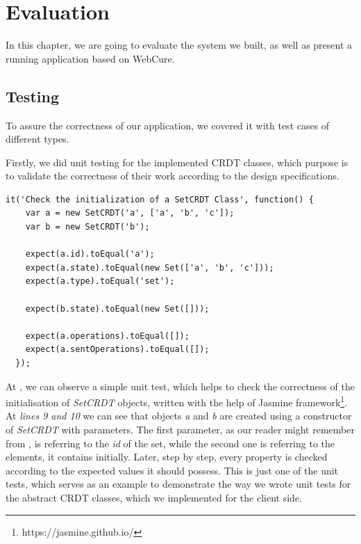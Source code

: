 \chapter{Evaluation}
\label{Evaluation}

In this chapter, we are going to evaluate the system we built, as well as present a running application based on WebCure. 

\section{Testing}

To assure the correctness of our application, we covered it with test cases of different types. 

Firstly, we did unit testing for the implemented CRDT classes, which purpose is to validate the correctness of their work according to the design specifications. 

\begin{lstlisting}[caption={[Unit test example for the \textit{SetCRDT} class]Simple unit test that checks the correct initialization of objects of a \textit{SetCRDT} class.}, label={lst:ev1}]
  it('Check the initialization of a SetCRDT Class', function() {
    var a = new SetCRDT('a', ['a', 'b', 'c']);
    var b = new SetCRDT('b');

    expect(a.id).toEqual('a');
    expect(a.state).toEqual(new Set(['a', 'b', 'c']));
    expect(a.type).toEqual('set');
    
    expect(b.state).toEqual(new Set([]));

    expect(a.operations).toEqual([]);
    expect(a.sentOperations).toEqual([]);
  });
\end{lstlisting}

At , we can observe a simple unit test, which helps to check the correctness of the initialisation of \textit{SetCRDT} objects, written with the help of Jasmine framework\footnote{https://jasmine.github.io/}. At \textit{lines 9 and 10} we can see that objects \textit{a} and \textit{b} are created using a constructor of \textit{SetCRDT} with parameters. The first parameter, as our reader might remember from , is referring to the \textit{id} of the set, while the second one is referring to the elements, it contains initially. Later, step by step, every property is checked according to the expected values it should possess. This is just one of the unit tests, which serves as an example to demonstrate the way we wrote unit tests for the abstract CRDT classes, which we implemented for the client side.


